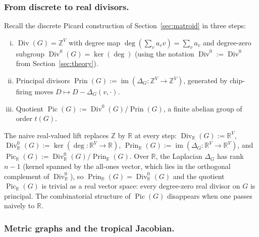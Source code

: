 \documentclass[11pt]{article}
\newcommand{\Z}{\mathbb{Z}}
\newcommand{\R}{\mathbb{R}}
\newcommand{\Div}{\operatorname{Div}^0}
\newcommand{\im}{\operatorname{im}}
\begin{document}
\subsubsection*{From discrete to real divisors.}

Recall the discrete Picard construction of Section~\ref{sec:matroid}
in three steps:
\begin{enumerate}[(i)]
  \item $\operatorname{Div}(G) = \Z^V$ with degree map
    $\deg(\sum_v a_v v) = \sum_v a_v$ and degree-zero subgroup
    $\Div(G) = \ker(\deg)$ (using the notation
    $\Div := \operatorname{Div}^0$ from Section~\ref{sec:theory}).
  \item Principal divisors
    $\operatorname{Prin}(G) := \im(\Delta_G : \Z^V \to \Z^V)$,
    generated by chip-firing moves $D \mapsto D - \Delta_G(v, \cdot)$.
  \item Quotient
    $\operatorname{Pic}(G) := \Div(G) / \operatorname{Prin}(G)$,
    a finite abelian group of order $t(G)$.
\end{enumerate}

\noindent The naive real-valued lift replaces $\Z$ by $\R$ at every step:
$\operatorname{Div}_\R(G) := \R^V$,
$\Div_\R(G) := \ker(\deg : \R^V \to \R)$,
$\operatorname{Prin}_\R(G) := \im(\Delta_G : \R^V \to \R^V)$, and
$\operatorname{Pic}_\R(G) := \Div_\R(G)/\operatorname{Prin}_\R(G)$.
Over $\R$, the Laplacian $\Delta_G$ has rank $n - 1$ (kernel spanned by
the all-ones vector, which lies in the orthogonal complement of
$\Div_\R$), so $\operatorname{Prin}_\R(G) = \Div_\R(G)$ and the quotient
$\operatorname{Pic}_\R(G)$ is trivial as a real vector space: every
degree-zero real divisor on $G$ is principal. The combinatorial
structure of $\operatorname{Pic}(G)$ disappears when one passes naively
to $\R$.

\subsubsection*{Metric graphs and the tropical Jacobian.}
\end{document}
